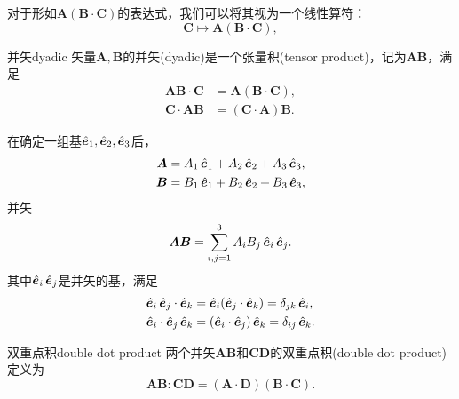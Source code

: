 
对于形如$\bm A(\bm B \cdot \bm C)$的表达式，我们可以将其视为一个线性算符：
\[
    \bm C \mapsto \bm A(\bm B \cdot \bm C),
\]

\begin{definition}
    {并矢}{dyadic}
    矢量$\bm A,\bm B$的并矢(dyadic)是一个张量积(tensor product)，记为$\bm A\bm B$，满足
    \begin{subequations}
        \begin{align}
            \bm A\bm B \cdot \bm C &= \bm A(\bm B \cdot \bm C),\\
            \bm C \cdot \bm A\bm B &= (\bm C \cdot \bm A)\bm B.
        \end{align}
    \end{subequations}
\end{definition}

\begin{corollary}
    在确定一组基$\mathop{}\!\hat{\bm{e}}_1,\mathop{}\!\hat{\bm{e}}_2,\mathop{}\!\hat{\bm{e}}_3$后，
    \begin{align*}
        \bm A &= A_1\mathop{}\!\hat{\bm{e}}_1 + A_2\mathop{}\!\hat{\bm{e}}_2 + A_3\mathop{}\!\hat{\bm{e}}_3,\\
        \bm B &= B_1\mathop{}\!\hat{\bm{e}}_1 + B_2\mathop{}\!\hat{\bm{e}}_2 + B_3\mathop{}\!\hat{\bm{e}}_3,
    \end{align*}
    并矢
    \begin{equation}
        \label{eq:ed-dyadic-components}
        \bm A\bm B = \sum_{i,j=1}^3 A_iB_j\mathop{}\!\hat{\bm{e}}_i\mathop{}\!\hat{\bm{e}}_j.
    \end{equation}
    其中$\mathop{}\!\hat{\bm{e}}_i\mathop{}\!\hat{\bm{e}}_j$是并矢的基，满足
    \begin{subequations}
        \begin{align}
            \uvec e_i\uvec e_j \cdot \uvec e_k &= \uvec e_i(\uvec e_j \cdot \uvec e_k) = \delta_{jk}\uvec e_i,\\
            \uvec e_i \cdot \uvec e_j\uvec e_k &= (\uvec e_i \cdot \uvec e_j)\uvec e_k = \delta_{ij}\uvec e_k.
        \end{align}
    \end{subequations}
\end{corollary}

\begin{definition}
    {双重点积}{double dot product}
    两个并矢$\bm A\bm B$和$\bm C\bm D$的双重点积(double dot product)定义为
    \begin{equation}
        \bm A\bm B:\bm C\bm D = (\bm A \cdot \bm D)(\bm B \cdot \bm C).
    \end{equation}
\end{definition}


